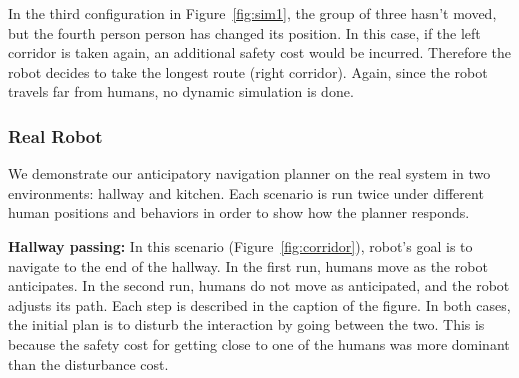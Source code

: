 \documentclass[12pt]{gatech-thesis}
\begin{document}
In the third configuration in Figure~\ref{fig:sim1}, the group of three hasn't moved, but the fourth person person has changed its position. In this case, if the left corridor is taken again, an additional safety cost would be incurred. Therefore the robot decides to take the longest route (right corridor). Again, since the robot travels far from humans, no dynamic simulation is done.

\subsubsection{Real Robot}

We demonstrate our anticipatory navigation planner on the real system in two environments: hallway and kitchen. Each scenario is run twice under different human positions and behaviors in order to show how the planner responds.

\textbf{Hallway passing: } In this scenario (Figure~\ref{fig:corridor}), robot's goal is to navigate to the end of the hallway. In the first run, humans move as the robot anticipates. In the second run, humans do not move as anticipated, and the robot adjusts its path. Each step is described in the caption of the figure. In both cases, the initial plan is to disturb the interaction by going between the two. This is because the safety cost for getting close to one of the humans was more dominant than the disturbance cost.
\end{document}
